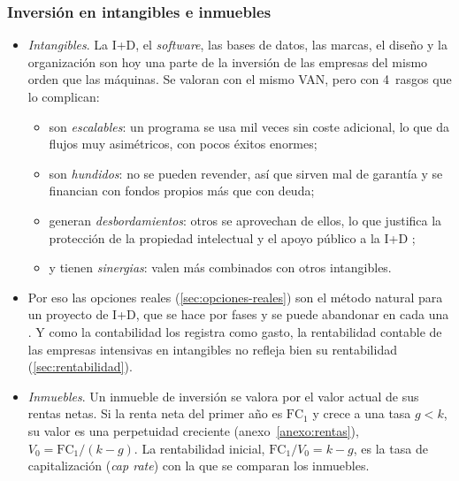 \documentclass[11pt]{article}
\begin{document}
\subsubsection{Inversión en intangibles e inmuebles}\label{sec:intangibles}

\begin{itemize}
\item \emph{Intangibles}. La I+D, el \emph{software}, las bases de datos, las marcas, el diseño y la organización son hoy una parte de la inversión de las empresas del mismo orden que las máquinas\nocite{CorradoHultenSichel2009Intangible}. Se valoran con el mismo VAN, pero con 4~rasgos que lo complican\nocite{HaskelWestlake2017Capitalism}:
  \begin{itemize}
  \item son \emph{escalables}: un programa se usa mil veces sin coste adicional, lo que da flujos muy asimétricos, con pocos éxitos enormes;
  \item son \emph{hundidos}: no se pueden revender, así que sirven mal de garantía y se financian con fondos propios más que con deuda;
  \item generan \emph{desbordamientos}: otros se aprovechan de ellos, lo que justifica la protección de la propiedad intelectual y el apoyo público a la I+D ;
  \item y tienen \emph{sinergias}: valen más combinados con otros intangibles.
  \end{itemize}
\item Por eso las opciones reales (\ref{sec:opciones-reales}) son el método natural para un proyecto de I+D, que se hace por fases y se puede abandonar en cada una . Y como la contabilidad los registra como gasto, la rentabilidad contable de las empresas intensivas en intangibles no refleja bien su rentabilidad (\ref{sec:rentabilidad}).
\item \emph{Inmuebles}. Un inmueble de inversión se valora por el valor actual de sus rentas netas. Si la renta neta del primer año es $\mathrm{FC}_1$ y crece a una tasa $g<k$, su valor es una perpetuidad creciente (anexo~\ref{anexo:rentas}), $V_0=\mathrm{FC}_1/(k-g)$. La rentabilidad inicial, $\mathrm{FC}_1/V_0=k-g$, es la tasa de capitalización (\emph{cap rate}) con la que se comparan los inmuebles.
\end{itemize}

\end{document}
